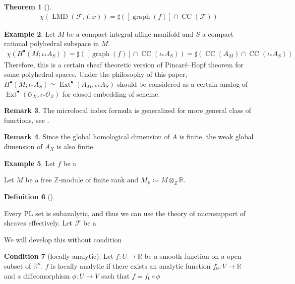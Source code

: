 \documentclass[a4paper,dvipdfmx,reqno,12pt]{amsart}
\theoremstyle{definition}
\newtheorem{Thm}{Theorem}[section]
\newtheorem{Def}[Thm]{Definition}
\newtheorem{Eg}[Thm]{Example}
\newtheorem{Rmk}[Thm]{Remark}
\newtheorem{Cond}[Thm]{Condition}
\newcommand{\deq}{\coloneqq}
\newcommand{\R}{\mathbb{R}}%
\newcommand{\Z}{\mathbb{Z}}%
\newcommand{\mcal}[1]{\mathcal{#1}}%
\newcommand{\opn}[1]{\operatorname{#1}}
\numberwithin{equation}{section}
\begin{document}
\begin{Thm}[{\cite[Theorem 9.5.6]{MR1299726}}]

\begin{align}
\chi(\opn{LMD}(\mcal{F},f,x))
=\sharp ([\opn{graph}(f)]\cap \opn{CC}(\mcal{F}))
\end{align}
\end{Thm}

\begin{Eg}
Let $M$ be a compact integral affine manifold and $S$  
a compact rational polyhedral subspace in $M$. 
\begin{align}
\chi(H^{\bullet}(M;\iota_*A_S))
=\sharp ([\opn{graph}(f)]\cap \opn{CC}(\iota_* A_S))
=\sharp (\opn{CC}(A_M)\cap \opn{CC}(\iota_* A_S))
\end{align}
Therefore, this is a certain sheaf theoretic version of 
Pincar\'e--Hopf theorem for some polyhedral spaces. Under
the philosophy of this paper, $H^{\bullet}(M;\iota_*A_S)\simeq 
\opn{Ext}^{\bullet}(A_M,\iota_*A_S)$
 should be considered as a
certain analog of 
$\opn{Ext}^{\bullet}(\mcal{O}_X,\iota_*\mcal{O}_Z)$ for closed embedding of 
scheme.
\end{Eg}

\begin{Rmk}
The microlocal index formula is generalized for more general 
class of functions, see \cite{}.
\end{Rmk}



\begin{Rmk}
Since the global homological 
dimension of $A$ is finite,
the weak global dimension of $A_X$ \cite[Definition 2.6.2]{MR1299726} is also finite.
\end{Rmk}

\begin{Eg}
Let $f$ be a 


\end{Eg}

Let $M$ be a free $\Z$-module of finite rank and 
$M_{\R}\deq M\otimes_{\Z}\R$.

\begin{Def}[{\cite{MR4294126}}]

\end{Def}

Every PL set is subanalytic, and thus 
we can use the theory of microsupport of sheaves
effectively.
Let $\mcal{F}$ be a 

We will develop this without condition 

\begin{Cond}[{locally analytic}]
Let 
$f\colon U \to \R$ be a smooth function on a open subset of $\R^{n}$.
$f$ is locally analytic if there exists an analytic function
$f_0\colon V\to \R$ and a diffeomorphism $\phi\colon U \to V$ such 
that $f=f_0\circ \phi $
\end{Cond}
\end{document}
